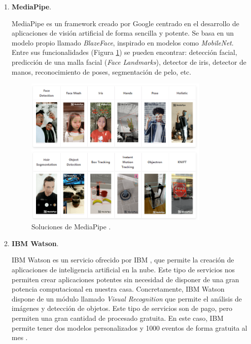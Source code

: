 \begin{enumerate}
	\item \textbf{MediaPipe}.
	
	MediaPipe \cite{mediapipe} es un framework creado por Google centrado en el desarrollo de aplicaciones de visión artificial de forma sencilla y potente. Se basa en un modelo propio llamado \textit{BlazeFace}, inspirado en modelos como \textit{MobileNet}. Entre sus funcionalidades (Figura \ref{fig:solMed}) se pueden encontrar: detección facial, predicción de una malla facial (\textit{Face Landmarks}), detector de iris, detector de manos, reconocimiento de poses, segmentación de pelo, etc.
	
	\begin{figure}[htp]
		\centering
		\includegraphics[width=9cm]{imagenes/solucionesMediaPipe.png}
		\caption[Soluciones de MediaPipe.]{Soluciones de MediaPipe \cite{mdSolutions}.}
		\label{fig:solMed}
	\end{figure}
	
	\item \textbf{IBM Watson}.
	
	IBM Watson es un servicio ofrecido por IBM \cite{ibmWatson}, que permite la creación de aplicaciones de inteligencia artificial en la nube. Este tipo de servicios nos permiten crear aplicaciones potentes sin necesidad de disponer de una gran potencia computacional en nuestra casa. Concretamente, IBM Watson dispone de un módulo llamado \textit{Visual Recognition} que permite el análisis de imágenes y detección de objetos. Este tipo de servicios son de pago, pero permiten una gran cantidad de procesado gratuita. En este caso, IBM permite tener dos modelos personalizados y 1000 eventos de forma gratuita al mes \cite{ibm}. 
\end{enumerate}



